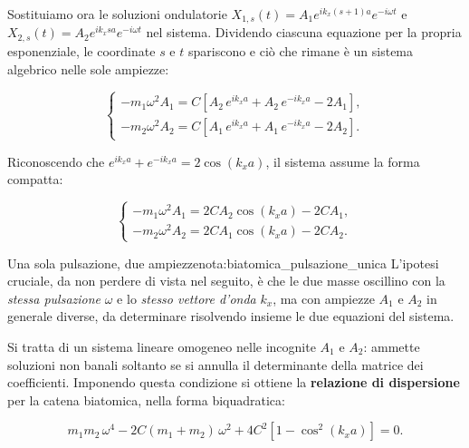 Sostituiamo ora le soluzioni ondulatorie \( X_{1,s}(t) = A_1 e^{i k_x (s+1) a} e^{-i \omega t} \) e \( X_{2,s}(t) = A_2 e^{i k_x s a} e^{-i \omega t} \) nel sistema. Dividendo ciascuna equazione per la propria esponenziale, le coordinate \( s \) e \( t \) spariscono e ciò che rimane è un sistema algebrico nelle sole ampiezze:

\begin{equation}
    \begin{cases}
        -m_1 \omega^{2} A_1 = C \left[ A_2 \, e^{i k_x a} + A_2 \, e^{-i k_x a} - 2 A_1 \right], \\[0.6em]
        -m_2 \omega^{2} A_2 = C \left[ A_1 \, e^{i k_x a} + A_1 \, e^{-i k_x a} - 2 A_2 \right].
    \end{cases}
\end{equation}

Riconoscendo che \( e^{i k_x a} + e^{-i k_x a} = 2 \cos(k_x a) \), il sistema assume la forma compatta:

\begin{equation}
    \begin{cases}
        -m_1 \omega^{2} A_1 = 2 C A_2 \cos(k_x a) - 2 C A_1, \\[0.6em]
        -m_2 \omega^{2} A_2 = 2 C A_1 \cos(k_x a) - 2 C A_2.
    \end{cases}
\end{equation}

\begin{note}{Una sola pulsazione, due ampiezze}{nota:biatomica_pulsazione_unica}
L'ipotesi cruciale, da non perdere di vista nel seguito, è che le due masse oscillino con la \emph{stessa pulsazione} \( \omega \) e lo \emph{stesso vettore d'onda} \( k_x \), ma con ampiezze \( A_1 \) e \( A_2 \) in generale diverse, da determinare risolvendo insieme le due equazioni del sistema.
\end{note}

Si tratta di un sistema lineare omogeneo nelle incognite \( A_1 \) e \( A_2 \): ammette soluzioni non banali soltanto se si annulla il determinante della matrice dei coefficienti. Imponendo questa condizione si ottiene la \textbf{relazione di dispersione} per la catena biatomica, nella forma biquadratica:

\begin{importantbox}
    \begin{equation}
        m_1 m_2 \, \omega^{4} - 2 C (m_1 + m_2) \, \omega^{2} + 4 C^{2} \left[ 1 - \cos^{2}(k_x a) \right] = 0.
    \end{equation}
\end{importantbox}

